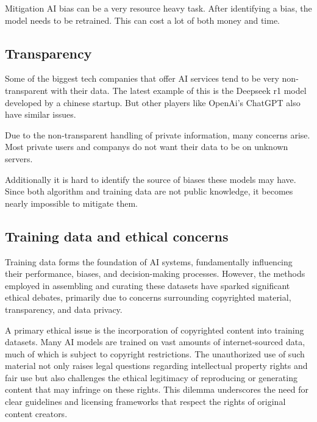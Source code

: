Mitigation AI bias can be a very resource heavy task. After identifying a bias, the model needs to be retrained. This can cost a lot of both money and time. 

\cite{AiDataBias}

\subsection{Transparency}
\label{subsec:transparence}

Some of the biggest tech companies that offer AI services tend to be very non-transparent with their data. 
The latest example of this is the Deepseek r1 model developed by a chinese startup. But other players like OpenAi's ChatGPT also have similar issues.

Due to the non-transparent handling of private information, many concerns arise. Most private users and companys do not want their data to be on unknown servers.

Additionally it is hard to identify the source of biases these models may have. Since both algorithm and training data are not public knowledge, it becomes nearly impossible to mitigate them.

\cite{larsson2020transparency}

\subsection{Training data and ethical concerns}
\label{subsec:training-data-and-ethical-concerns}

Training data forms the foundation of AI systems, fundamentally influencing their performance, biases, and decision-making processes. However, the methods employed in assembling and curating these datasets have sparked significant ethical debates, primarily due to concerns surrounding copyrighted material, transparency, and data privacy.

A primary ethical issue is the incorporation of copyrighted content into training datasets. Many AI models are trained on vast amounts of internet-sourced data, much of which is subject to copyright restrictions. The unauthorized use of such material not only raises legal questions regarding intellectual property rights and fair use but also challenges the ethical legitimacy of reproducing or generating content that may infringe on these rights. This dilemma underscores the need for clear guidelines and licensing frameworks that respect the rights of original content creators.

